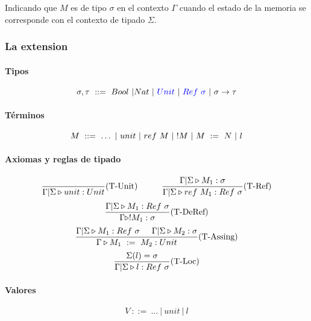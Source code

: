 Indicando que $M$ es de tipo $\sigma$ en el contexto $\Gamma$ cuando el estado de la memoria se corresponde con el contexto de tipado $\Sigma$.

\subsubsection{La extension}

\paragraph{Tipos}
$$\sigma, \tau ~::=~ Bool~|Nat~|~\color{blue}Unit\color{black}~|~\color{blue}Ref~\sigma\color{black}~|~\sigma\to\tau$$

\paragraph{Términos}

$$ M~::=~ \dots~|~unit~|~ref~M~|~!M~|~M~:=~N~|~    l$$

\paragraph{Axiomas y reglas de tipado}
\begin{equation*}
	\frac{}{\Gamma|\Sigma\triangleright unit : Unit}(\text{T-Unit})\hspace*{1cm}\frac{\Gamma|\Sigma\triangleright M_1 : \sigma}{\Gamma|\Sigma\triangleright ref~M_1 : Ref~\sigma}(\text{T-Ref})
\end{equation*}
\vspace*{5mm}
\begin{equation*}
	\frac{\Gamma|\Sigma\triangleright M_1 : Ref~\sigma}{\Gamma\triangleright !M_1 : \sigma}(\text{T-DeRef})
\end{equation*}
\vspace*{5mm}
\begin{equation*}
	\frac{\Gamma|\Sigma\triangleright M_1 : Ref~\sigma\hspace*{5mm}\Gamma|\Sigma\triangleright M_2 : \sigma}{\Gamma\triangleright M_1~:=~M_2 : Unit}(\text{T-Assing})
\end{equation*}
\vspace*{5mm}
\begin{equation*}
	\frac{\Sigma(l) = \sigma}{\Gamma|\Sigma\triangleright l : Ref~\sigma}(\text{T-Loc})
\end{equation*}

\paragraph{Valores}
$$V~::=~\dots~|~unit~|~l$$


